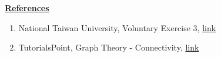 \documentclass[12pt]{article}
\begin{document}
\begin{enumerate}[1.]
    \bigskip

    \underline{\textbf{References}}

    \bigskip

    \begin{enumerate}[1)]
        \item National Taiwan University, Voluntary Exercise 3, \href{https://www.csie.ntu.edu.tw/~r95122/alg07spr/alg07spr_hw3sol.pdf}{link}
        \item TutorialsPoint, Graph Theory - Connectivity, \href{https://www.tutorialspoint.com/graph_theory/graph_theory_connectivity.htm}{link}
    \end{enumerate}

\end{enumerate}
\end{document}
